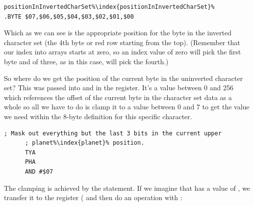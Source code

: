 \begin{lstlisting}[escapechar=\%]
positionInInvertedCharSet%\index{positionInInvertedCharSet}%      .BYTE $07,$06,$05,$04,$03,$02,$01,$00
\end{lstlisting}

Which as we can see is the appropriate position for the byte in the inverted character set (the
4th byte or red row starting from the top). (Remember that our index into arrays starts at zero,
so an index value of zero will pick the first byte and of three, as in this case, will pick the fourth.)

\begin{figure}[H]
{
  \setlength{\tabcolsep}{3.0pt}
  \setlength\cmidrulewidth{\heavyrulewidth} %
    \begin{adjustbox}{width=6cm,center}
  \begin{subfigure}{0.3\textwidth}
  
  \end{subfigure}
  \end{adjustbox}
}\caption[]{}
\end{figure}

So where do we get the position of the current byte in the uninverted character set? This was
passed into  and  in the 
register. It's a value between 0 and 256 which references the offset of the current byte
in the character set data as a whole so all we have to do is clamp it to a value between 0 and 7
to get the value we need within the 8-byte definition for this specific character.

\begin{lstlisting}[escapechar=\%]
      ; Mask out everything but the last 3 bits in the current upper
      ; planet%\index{planet}% position. 
      TYA
      PHA
      AND #$07
\end{lstlisting}

The clamping is achieved by the  statement. If we imagine that  has a value of
, we transfer it to the  register ( and then do an  operation
with :

